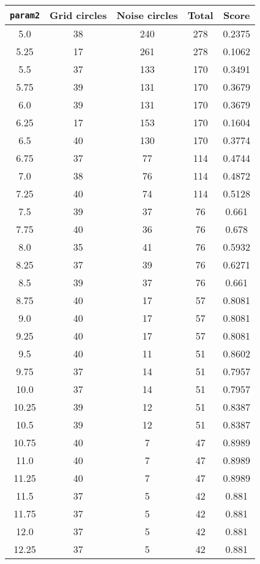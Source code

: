 \documentclass[letterpaper, 12pt]{article}
\begin{document}
\begin{longtable}{|c|c|c|c|c|}
\hline
\textbf{\texttt{param2}} & \textbf{Grid circles} & \textbf{Noise circles} & \textbf{Total} & \textbf{Score} \\
\hline
5.0 & 38 & 240 & 278 & 0.2375 \\
\hline
5.25 & 17 & 261 & 278 & 0.1062 \\
\hline
5.5 & 37 & 133 & 170 & 0.3491 \\
\hline
5.75 & 39 & 131 & 170 & 0.3679 \\
\hline
6.0 & 39 & 131 & 170 & 0.3679 \\
\hline
6.25 & 17 & 153 & 170 & 0.1604 \\
\hline
6.5 & 40 & 130 & 170 & 0.3774 \\
\hline
6.75 & 37 & 77 & 114 & 0.4744 \\
\hline
7.0 & 38 & 76 & 114 & 0.4872 \\
\hline
7.25 & 40 & 74 & 114 & 0.5128 \\
\hline
7.5 & 39 & 37 & 76 & 0.661 \\
\hline
7.75 & 40 & 36 & 76 & 0.678 \\
\hline
8.0 & 35 & 41 & 76 & 0.5932 \\
\hline
8.25 & 37 & 39 & 76 & 0.6271 \\
\hline
8.5 & 39 & 37 & 76 & 0.661 \\
\hline
8.75 & 40 & 17 & 57 & 0.8081 \\
\hline
9.0 & 40 & 17 & 57 & 0.8081 \\
\hline
9.25 & 40 & 17 & 57 & 0.8081 \\
\hline
9.5 & 40 & 11 & 51 & 0.8602 \\
\hline
9.75 & 37 & 14 & 51 & 0.7957 \\
\hline
10.0 & 37 & 14 & 51 & 0.7957 \\
\hline
10.25 & 39 & 12 & 51 & 0.8387 \\
\hline
10.5 & 39 & 12 & 51 & 0.8387 \\
\hline
10.75 & 40 & 7 & 47 & 0.8989 \\
\hline
11.0 & 40 & 7 & 47 & 0.8989 \\
\hline
11.25 & 40 & 7 & 47 & 0.8989 \\
\hline
11.5 & 37 & 5 & 42 & 0.881 \\
\hline
11.75 & 37 & 5 & 42 & 0.881 \\
\hline
12.0 & 37 & 5 & 42 & 0.881 \\
\hline
12.25 & 37 & 5 & 42 & 0.881 \\
\hline

\end{longtable}
\end{document}
